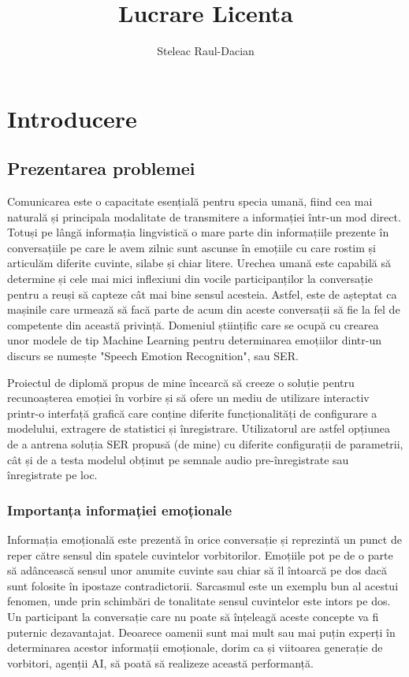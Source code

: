\documentclass[a4paper,12pt]{book}
\title{Lucrare Licenta}
\author{Steleac Raul-Dacian}
\begin{document}
	
	\clearpage
	\thispagestyle{empty}
	\tableofcontents
	\thispagestyle{empty}
	\clearpage
	\newpage 
	\thispagestyle{empty}
	
	\chapter{Introducere}
	
		\section{Prezentarea problemei}
						
			\setlength{\parindent}{0.8cm}
			
			Comunicarea este o capacitate esențială pentru specia umană, fiind cea mai naturală și principala modalitate de transmitere a informației într-un mod direct. Totuși pe lângă informația lingvistică o mare parte din informațiile prezente în conversațiile pe care le avem zilnic sunt ascunse în emoțiile cu care rostim și articulăm diferite cuvinte, silabe și chiar litere. Urechea umană este capabilă să determine și cele mai mici inflexiuni din vocile participanților la conversație pentru a reuși să capteze cât mai bine sensul acesteia. Astfel, este de așteptat ca mașinile care urmează să facă parte de acum din aceste conversații să fie la fel de competente din această privință. Domeniul științific care se ocupă cu crearea unor modele de tip Machine Learning pentru determinarea emoțiilor dintr-un discurs se numește "Speech Emotion Recognition", sau SER. \par
			
			Proiectul de diplomă propus de mine încearcă să creeze o soluție pentru recunoașterea emoției în vorbire și să ofere un mediu de utilizare interactiv printr-o interfață grafică care conține diferite funcționalități de configurare a modelului, extragere de statistici și înregistrare. Utilizatorul are astfel opțiunea de a antrena soluția SER propusă (de mine) cu diferite configurații de parametrii, cât și de a testa modelul obținut pe semnale audio pre-înregistrate sau înregistrate pe loc.\par
			
			\subsection{Importanța informației emoționale}
				Informația emoțională este prezentă în orice conversație și reprezintă un punct de reper către sensul din spatele cuvintelor vorbitorilor. Emoțiile pot pe de o parte să adâncească sensul unor anumite cuvinte sau chiar să îl întoarcă pe dos dacă sunt folosite în ipostaze contradictorii. Sarcasmul este un exemplu bun al acestui fenomen, unde prin schimbări de tonalitate sensul cuvintelor este intors pe dos. Un participant la conversație care nu poate să înțeleagă aceste concepte va fi puternic dezavantajat. Deoarece oamenii sunt mai mult sau mai puțin experți în determinarea acestor informații emoționale, dorim ca și viitoarea generație de vorbitori, agenții AI, să poată să realizeze această performanță.\par
				
\end{document}

